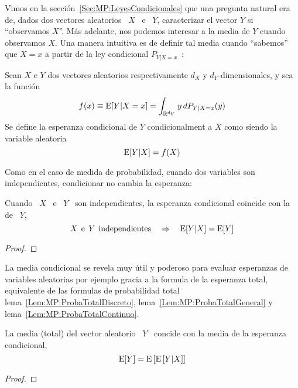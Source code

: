 \label{Sec:MP:EsperanzaCondicional}

Vimos en  la secci\'on~\ref{Sec:MP:LeyesCondicionales} que  una pregunta natural
era de, dados  dos vectores aleatorios \  $X$ \ e \ $Y$,  caracterizar el vector
$Y$ si ``observamos $X$''.  M\'as adelante,  nos podemos interesar a la media de
$Y$ cuando observamos  $X$. Una manera intuitiva es de  definir tal media cuando
``sabemos'' que  $X=x$ a partir  de la ley  condicional $P_{Y|X=x}$~\cite{Fel68,
  Fel71, AthLah06, Spi76, Kol56, JacPro03}:

\begin{definicion}
  Sean   $X$   e  $Y$   dos   vectores   aleatorios   respectivamente  $d_X$   y
  $d_Y$-dimensionales, y sea la funci\'on
  \[
  f(x) \equiv \operatorname{E}[Y | X=x ] = \int_{\mathbb{R}^{d_Y}} y \, dP_{Y|X=x}(y)
  \]
  Se define la esperanza condicional de $Y$ condicionalment a $X$ como siendo la
  variable aleatoria
  \[
  \operatorname{E}[Y|X] = f(X)
  \]
\end{definicion}

Como  en  el   caso  de  medida  de  probabilidad,   cuando  dos  variables  son
independientes, condicionar no cambia la esperanza:
%
\begin{lema}
Cuando \ $X$ \ e \ $Y$ \ son independientes, la esperanza condicional coincide con la de \ $Y$,
%
\[
X \:\: \mbox{e} \:\: Y \:\: \mbox{independientes} \quad \Rightarrow \quad \operatorname{E}[Y|X] = \operatorname{E}[Y]
\]
\end{lema}
\begin{proof}
\end{proof}

La media condicional se revela muy  \'util y poderoso para evaluar esperanzas de
variables  aleatorias por ejemplo  gracia a  la formula  de la  esperanza total,
equivalente      de      las       formulas      de      probabilidad      total
lema~\ref{Lem:MP:ProbaTotalDiscreto},    lema~\ref{Lem:MP:ProbaTotalGeneral}   y
lema~\ref{Lem:MP:ProbaTotalContinuo}.
%
\begin{teorema}\label{Teo:MP:EsperanzaTotal}
%
  La media  (total) del  vector aleatorio  \ $Y$ \  concide con  la media  de la
  esperanza condicional, \ie
%
\[
\operatorname{E}[Y] = \operatorname{E}\left[ \operatorname{E}\left[ Y | X\right] \right]
\]
\end{teorema}
%
\begin{proof}
\end{proof}

